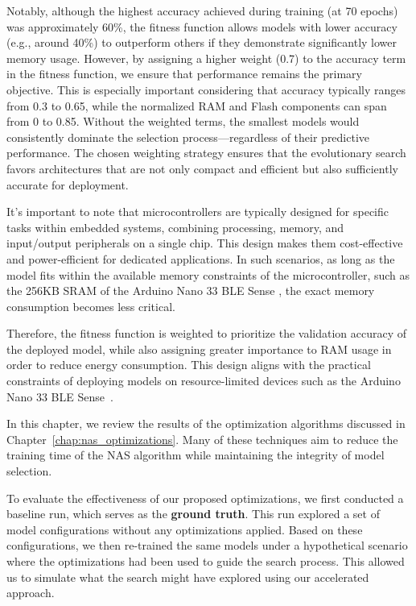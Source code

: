 Notably, although the highest accuracy achieved during training (at 70 epochs) was approximately 60\%, the fitness function allows models with lower accuracy (e.g., around 40\%) to outperform others if they demonstrate significantly lower memory usage. However, by assigning a higher weight (0.7) to the accuracy term in the fitness function, we ensure that performance remains the primary objective. This is especially important considering that accuracy typically ranges from 0.3 to 0.65, while the normalized RAM and Flash components can span from 0 to 0.85. Without the weighted terms, the smallest models would consistently dominate the selection process—regardless of their predictive performance. The chosen weighting strategy ensures that the evolutionary search favors architectures that are not only compact and efficient but also sufficiently accurate for deployment.

It's important to note that microcontrollers are typically designed for specific tasks within embedded systems, combining processing, memory, and input/output peripherals on a single chip. This design makes them cost-effective and power-efficient for dedicated applications. In such scenarios, as long as the model fits within the available memory constraints of the microcontroller, such as the 256KB SRAM of the Arduino Nano 33 BLE Sense , the exact memory consumption becomes less critical. 

Therefore, the fitness function is weighted to prioritize the validation accuracy of the deployed model, while also assigning greater importance to RAM usage in order to reduce energy consumption. This design aligns with the practical constraints of deploying models on resource-limited devices such as the Arduino Nano 33 BLE Sense~\cite{arduino_nano33ble}.

In this chapter, we review the results of the optimization algorithms discussed in Chapter~\ref{chap:nas_optimizations}. Many of these techniques aim to reduce the training time of the NAS algorithm while maintaining the integrity of model selection. 

To evaluate the effectiveness of our proposed optimizations, we first conducted a baseline run, which serves as the \textbf{ground truth}. This run explored a set of model configurations without any optimizations applied. Based on these configurations, we then re-trained the same models under a hypothetical scenario where the optimizations had been used to guide the search process. This allowed us to simulate what the search might have explored using our accelerated approach.

